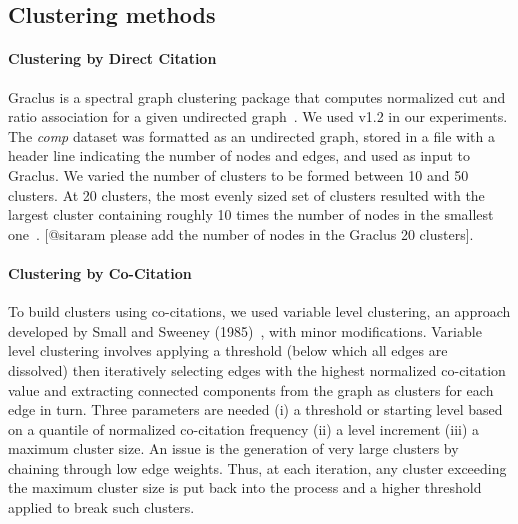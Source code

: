 \subsection{Clustering methods}

\paragraph{Clustering by Direct Citation} Graclus is a spectral graph clustering package that computes normalized cut and ratio association for a given undirected graph~\cite{graclus_2007}.  We used v1.2 in our experiments.
The \emph{comp} dataset was formatted as an undirected graph, stored in a file with a header line indicating the number of nodes and edges, and used as input to Graclus. We varied the number of clusters to be formed between 10 and 50 clusters. At 20 clusters, the most evenly sized set of clusters resulted with the largest cluster containing roughly 10 times the number of nodes in the smallest one~\cite{traag_louvain_2019}. [@sitaram please add the number of nodes in the Graclus 20 clusters]. 

\paragraph{Clustering by Co-Citation} To build clusters using co-citations, we used variable level clustering, an approach developed by Small and Sweeney (1985)~\cite{small_clustering_1985}, with minor modifications. Variable level clustering involves applying a threshold (below which all edges are dissolved) then iteratively selecting edges with the highest normalized co-citation value and extracting connected components from the graph as clusters for each edge in turn. Three parameters are needed (i) a threshold or starting level based on a quantile of normalized co-citation frequency (ii) a level increment (iii) a maximum cluster size. An issue is the generation of very large clusters by chaining through low edge weights.  Thus, at each iteration, any cluster exceeding the maximum cluster size is put back into the process and a higher threshold applied to break such clusters.

